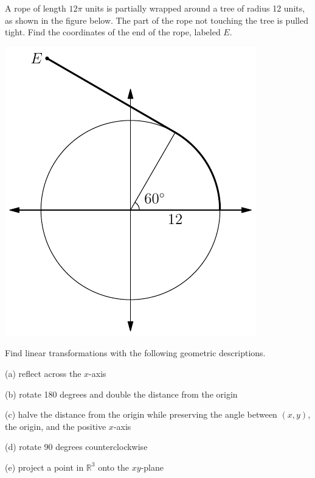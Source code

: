\documentclass{watsonbook}
\begin{document}
\begin{aexercise}
  A rope of length $12\pi$ units is partially wrapped around a tree of radius 12 units, as shown in the figure below. The part of the rope not touching the tree is pulled tight. Find the coordinates of the end of the rope, labeled $E$. 
  \begin{center}
    \includegraphics{exercisefigures/ropetree}
  \end{center}
\end{aexercise}

\newpage 


\begin{aexercise}
Find linear transformations with the following geometric
descriptions. 

(a) reflect across the $x$-axis

(b) rotate 180 degrees and double the distance from the origin

(c) halve the distance from the origin while preserving the angle
between $(x,y)$, the origin, and the positive $x$-axis

(d) rotate 90 degrees counterclockwise

(e) project a point in $\mathbb{R}^3$ onto the $xy$-plane
\end{aexercise}

\end{document}
